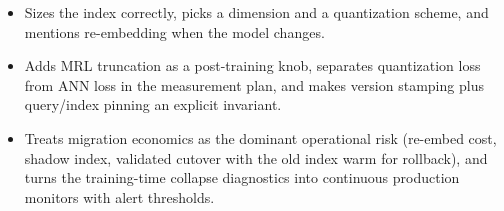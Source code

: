 \begin{interviewq}
\goodgreat
\begin{itemize}
    \item {} Sizes the index correctly, picks a dimension and a quantization scheme, and mentions re-embedding when the model changes.
    \item {} Adds MRL truncation as a post-training knob, separates quantization loss from ANN loss in the measurement plan, and makes version stamping plus query/index pinning an explicit invariant.
    \item {} Treats migration economics as the dominant operational risk (re-embed cost, shadow index, validated cutover with the old index warm for rollback), and turns the training-time collapse diagnostics into continuous production monitors with alert thresholds.
\end{itemize}

\end{interviewq}


